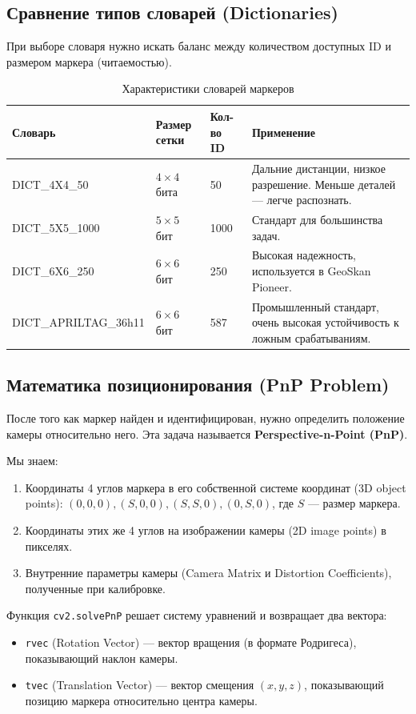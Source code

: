 \subsection{Сравнение типов словарей (Dictionaries)}
При выборе словаря нужно искать баланс между количеством доступных ID и размером маркера (читаемостью).

\begin{table}[H]
\centering
\begin{tabularx}{\textwidth}{|l|X|X|X|}
\hline
\textbf{Словарь} & \textbf{Размер сетки} & \textbf{Кол-во ID} & \textbf{Применение} \\ \hline
DICT\_4X4\_50 & $4 \times 4$ бита & 50 & Дальние дистанции, низкое разрешение. Меньше деталей — легче распознать. \\ \hline
DICT\_5X5\_1000 & $5 \times 5$ бит & 1000 & Стандарт для большинства задач. \\ \hline
DICT\_6X6\_250 & $6 \times 6$ бит & 250 & Высокая надежность, используется в GeoSkan Pioneer. \\ \hline
DICT\_APRILTAG\_36h11 & $6 \times 6$ бит & 587 & Промышленный стандарт, очень высокая устойчивость к ложным срабатываниям. \\ \hline
\end{tabularx}
\caption{Характеристики словарей маркеров}
\end{table}

\subsection{Математика позиционирования (PnP Problem)}
После того как маркер найден и идентифицирован, нужно определить положение камеры относительно него. Эта задача называется \textbf{Perspective-n-Point (PnP)}.

Мы знаем:
\begin{enumerate}
    \item Координаты 4 углов маркера в его собственной системе координат (3D object points): $(0,0,0), (S,0,0), (S,S,0), (0,S,0)$, где $S$ — размер маркера.
    \item Координаты этих же 4 углов на изображении камеры (2D image points) в пикселях.
    \item Внутренние параметры камеры (Camera Matrix и Distortion Coefficients), полученные при калибровке.
\end{enumerate}

Функция \texttt{cv2.solvePnP} решает систему уравнений и возвращает два вектора:
\begin{itemize}
    \item \texttt{rvec} (Rotation Vector) — вектор вращения (в формате Родригеса), показывающий наклон камеры.
    \item \texttt{tvec} (Translation Vector) — вектор смещения $(x, y, z)$, показывающий позицию маркера относительно центра камеры.
\end{itemize}

